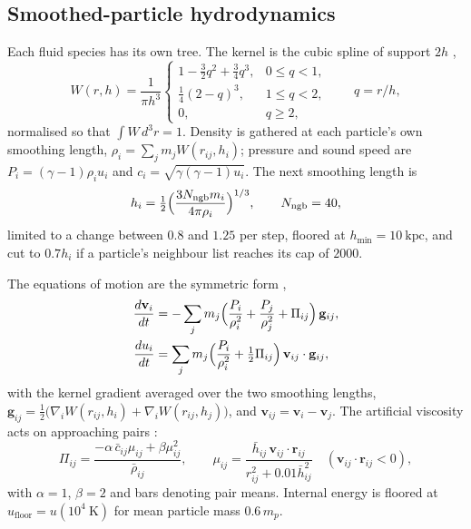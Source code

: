 \documentclass[11pt]{article}
\theoremstyle{definition}
\newcommand{\kpc}{\mathrm{kpc}}
\begin{document}
\subsection{Smoothed-particle hydrodynamics}

Each fluid species has its own tree. The kernel is the cubic spline of support $2h$ \cite{MonaghanLattanzio1985},
\[
W(r, h) = \frac{1}{\pi h^{3}}
\begin{cases}
1 - \tfrac{3}{2}q^{2} + \tfrac{3}{4}q^{3}, & 0 \le q < 1,\\[2pt]
\tfrac{1}{4}(2 - q)^{3}, & 1 \le q < 2,\\[2pt]
0, & q \ge 2,
\end{cases}
\qquad q = r/h ,
\]
normalised so that $\int W\,d^{3}r = 1$. Density is gathered at each particle's own smoothing length, $\rho_{i} = \sum_{j} m_{j}W(r_{ij}, h_{i})$; pressure and sound speed are $P_{i} = (\gamma - 1)\rho_{i}u_{i}$ and $c_{i} = \sqrt{\gamma(\gamma - 1)u_{i}}$. The next smoothing length is
\[
h_{i} = \tfrac{1}{2}\Bigl(\frac{3N_{\mathrm{ngb}}m_{i}}{4\pi\rho_{i}}\Bigr)^{1/3}, \qquad N_{\mathrm{ngb}} = 40,
\]
limited to a change between $0.8$ and $1.25$ per step, floored at $h_{\min} = 10\ \kpc$, and cut to $0.7h_{i}$ if a particle's neighbour list reaches its cap of $2000$.

The equations of motion are the symmetric form \cite{Monaghan1992},
\begin{align*}
\frac{d\mathbf{v}_{i}}{dt} &= -\sum_{j} m_{j}\Bigl(\frac{P_{i}}{\rho_{i}^{2}} + \frac{P_{j}}{\rho_{j}^{2}} + \Pi_{ij}\Bigr)\,\mathbf{g}_{ij},
\\
\frac{du_{i}}{dt} &= \sum_{j} m_{j}\Bigl(\frac{P_{i}}{\rho_{i}^{2}} + \tfrac{1}{2}\Pi_{ij}\Bigr)\,\mathbf{v}_{ij}\cdot\mathbf{g}_{ij},
\end{align*}
with the kernel gradient averaged over the two smoothing lengths, $\mathbf{g}_{ij} = \tfrac{1}{2}\bigl(\nabla_{i}W(r_{ij}, h_{i}) + \nabla_{i}W(r_{ij}, h_{j})\bigr)$, and $\mathbf{v}_{ij} = \mathbf{v}_{i} - \mathbf{v}_{j}$. The artificial viscosity acts on approaching pairs \cite{MonaghanGingold1983}:
\[
\Pi_{ij} = \frac{-\alpha\,\bar{c}_{ij}\mu_{ij} + \beta\mu_{ij}^{2}}{\bar{\rho}_{ij}}, \qquad
\mu_{ij} = \frac{\bar{h}_{ij}\,\mathbf{v}_{ij}\cdot\mathbf{r}_{ij}}{r_{ij}^{2} + 0.01\bar{h}_{ij}^{2}} \quad (\mathbf{v}_{ij}\cdot\mathbf{r}_{ij} < 0),
\]
with $\alpha = 1$, $\beta = 2$ and bars denoting pair means. Internal energy is floored at $u_{\mathrm{floor}} = u(10^{4}\ \mathrm{K})$ for mean particle mass $0.6\,m_{p}$.
\end{document}
